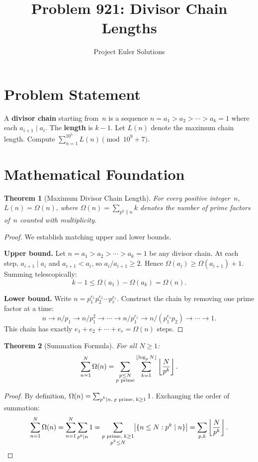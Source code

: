 \documentclass[11pt]{article}
\title{Problem 921: Divisor Chain Lengths}
\author{Project Euler Solutions}
\date{}
\newtheorem{theorem}{Theorem}
\theoremstyle{definition}
\begin{document}
\maketitle

\section{Problem Statement}

A \textbf{divisor chain} starting from~$n$ is a sequence $n = a_1 > a_2 > \cdots > a_k = 1$ where each $a_{i+1} \mid a_i$. The \textbf{length} is $k-1$. Let $L(n)$ denote the maximum chain length. Compute $\sum_{n=1}^{10^5} L(n) \pmod{10^9+7}$.

\section{Mathematical Foundation}

\begin{theorem}[Maximum Divisor Chain Length]
For every positive integer~$n$, $L(n) = \Omega(n)$, where $\Omega(n) = \sum_{p^k \| n} k$ denotes the number of prime factors of~$n$ counted with multiplicity.
\end{theorem}

\begin{proof}
We establish matching upper and lower bounds.

\textbf{Upper bound.} Let $n = a_1 > a_2 > \cdots > a_k = 1$ be any divisor chain. At each step, $a_{i+1} \mid a_i$ and $a_{i+1} < a_i$, so $a_i / a_{i+1} \geq 2$. Hence $\Omega(a_i) \geq \Omega(a_{i+1}) + 1$. Summing telescopically:
\[
k - 1 \leq \Omega(a_1) - \Omega(a_k) = \Omega(n).
\]

\textbf{Lower bound.} Write $n = p_1^{e_1} p_2^{e_2} \cdots p_r^{e_r}$. Construct the chain by removing one prime factor at a time:
\[
n \to n/p_1 \to n/p_1^2 \to \cdots \to n/p_1^{e_1} \to n/(p_1^{e_1}p_2) \to \cdots \to 1.
\]
This chain has exactly $e_1 + e_2 + \cdots + e_r = \Omega(n)$ steps.
\end{proof}

\begin{theorem}[Summation Formula]
For all $N \geq 1$:
\[
\sum_{n=1}^{N} \Omega(n) = \sum_{\substack{p \leq N \\ p \textup{ prime}}} \sum_{k=1}^{\lfloor \log_p N \rfloor} \left\lfloor \frac{N}{p^k} \right\rfloor.
\]
\end{theorem}

\begin{proof}
By definition, $\Omega(n) = \sum_{\substack{p^k \mid n,\; p \textup{ prime},\; k \geq 1}} 1$. Exchanging the order of summation:
\[
\sum_{n=1}^{N} \Omega(n) = \sum_{n=1}^{N} \sum_{p^k \mid n} 1 = \sum_{\substack{p \textup{ prime},\; k \geq 1 \\ p^k \leq N}} \bigl|\{n \leq N : p^k \mid n\}\bigr| = \sum_{p,k} \left\lfloor \frac{N}{p^k} \right\rfloor. \qedhere
\]
\end{proof}
\end{document}

